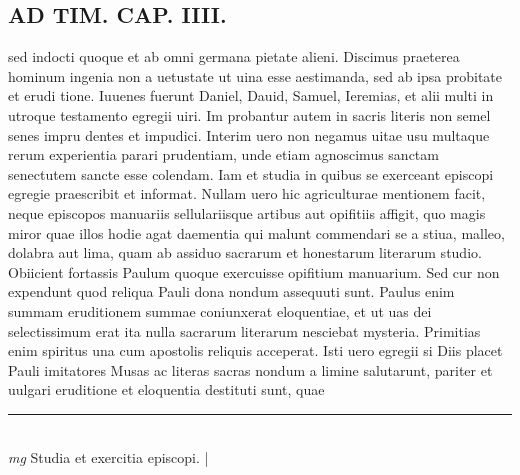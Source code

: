 \documentclass{article}
\begin{document}
\begin{pages}
\section*{AD TIM. CAP. IIII. }
\marginpar{[ p.145 ]}\pstart sed indocti quoque et ab omni germana pietate alieni. Discimus praeterea hominum ingenia non a uetustate ut uina esse aestimanda, sed ab ipsa probitate et erudi tione. Iuuenes fuerunt Daniel, Dauid, Samuel, Ieremias, et alii multi in utroque testamento egregii uiri. Im probantur autem in sacris literis non semel senes impru dentes et impudici. Interim uero non negamus uitae usu multaque rerum experientia parari prudentiam, unde etiam agnoscimus sanctam senectutem sancte esse colendam. Iam et studia in quibus se exerceant episcopi egregie praescribit et informat. Nullam uero hic agriculturae mentionem facit, neque episcopos manuariis sellulariisque artibus aut opifitiis affigit, quo magis miror quae illos hodie agat daementia qui malunt commendari se a stiua, malleo, dolabra aut lima, quam ab assiduo sacrarum et honestarum literarum studio. Obiicient fortassis Paulum quoque exercuisse opifitium manuarium. Sed cur non expendunt quod reliqua Pauli dona nondum assequuti sunt. Paulus enim summam eruditionem summae coniunxerat eloquentiae, et ut uas dei selectissimum erat ita nulla sacrarum literarum nesciebat mysteria. Primitias enim spiritus una cum apostolis reliquis acceperat. Isti uero egregii si Diis placet Pauli imitatores Musas ac literas sacras nondum a limine salutarunt, pariter et uulgari eruditione et eloquentia destituti sunt, quae  \pend
\vspace{0.5cm}\noindent
\vspace{0.2cm}\rule{1cm}{0.2pt}\\ 
\hspace{0.2cm}\textit{mg}
\footnotesize Studia et exercitia episcopi. 
\normalsize| 

\end{pages}
\end{document}
